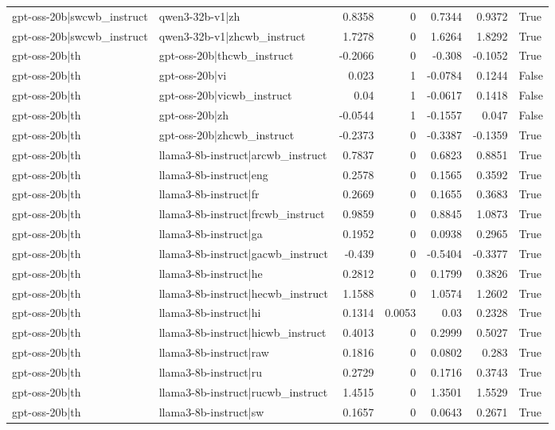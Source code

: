 \begin{table}
\begin{tabular}{l l r r r r l}
gpt-oss-20b|swcwb_instruct & qwen3-32b-v1|zh & 0.8358 & 0 & 0.7344 & 0.9372 & True \\
gpt-oss-20b|swcwb_instruct & qwen3-32b-v1|zhcwb_instruct & 1.7278 & 0 & 1.6264 & 1.8292 & True \\
gpt-oss-20b|th & gpt-oss-20b|thcwb_instruct & -0.2066 & 0 & -0.308 & -0.1052 & True \\
gpt-oss-20b|th & gpt-oss-20b|vi & 0.023 & 1 & -0.0784 & 0.1244 & False \\
gpt-oss-20b|th & gpt-oss-20b|vicwb_instruct & 0.04 & 1 & -0.0617 & 0.1418 & False \\
gpt-oss-20b|th & gpt-oss-20b|zh & -0.0544 & 1 & -0.1557 & 0.047 & False \\
gpt-oss-20b|th & gpt-oss-20b|zhcwb_instruct & -0.2373 & 0 & -0.3387 & -0.1359 & True \\
gpt-oss-20b|th & llama3-8b-instruct|arcwb_instruct & 0.7837 & 0 & 0.6823 & 0.8851 & True \\
gpt-oss-20b|th & llama3-8b-instruct|eng & 0.2578 & 0 & 0.1565 & 0.3592 & True \\
gpt-oss-20b|th & llama3-8b-instruct|fr & 0.2669 & 0 & 0.1655 & 0.3683 & True \\
gpt-oss-20b|th & llama3-8b-instruct|frcwb_instruct & 0.9859 & 0 & 0.8845 & 1.0873 & True \\
gpt-oss-20b|th & llama3-8b-instruct|ga & 0.1952 & 0 & 0.0938 & 0.2965 & True \\
gpt-oss-20b|th & llama3-8b-instruct|gacwb_instruct & -0.439 & 0 & -0.5404 & -0.3377 & True \\
gpt-oss-20b|th & llama3-8b-instruct|he & 0.2812 & 0 & 0.1799 & 0.3826 & True \\
gpt-oss-20b|th & llama3-8b-instruct|hecwb_instruct & 1.1588 & 0 & 1.0574 & 1.2602 & True \\
gpt-oss-20b|th & llama3-8b-instruct|hi & 0.1314 & 0.0053 & 0.03 & 0.2328 & True \\
gpt-oss-20b|th & llama3-8b-instruct|hicwb_instruct & 0.4013 & 0 & 0.2999 & 0.5027 & True \\
gpt-oss-20b|th & llama3-8b-instruct|raw & 0.1816 & 0 & 0.0802 & 0.283 & True \\
gpt-oss-20b|th & llama3-8b-instruct|ru & 0.2729 & 0 & 0.1716 & 0.3743 & True \\
gpt-oss-20b|th & llama3-8b-instruct|rucwb_instruct & 1.4515 & 0 & 1.3501 & 1.5529 & True \\
gpt-oss-20b|th & llama3-8b-instruct|sw & 0.1657 & 0 & 0.0643 & 0.2671 & True \\

\end{tabular}
\end{table}
